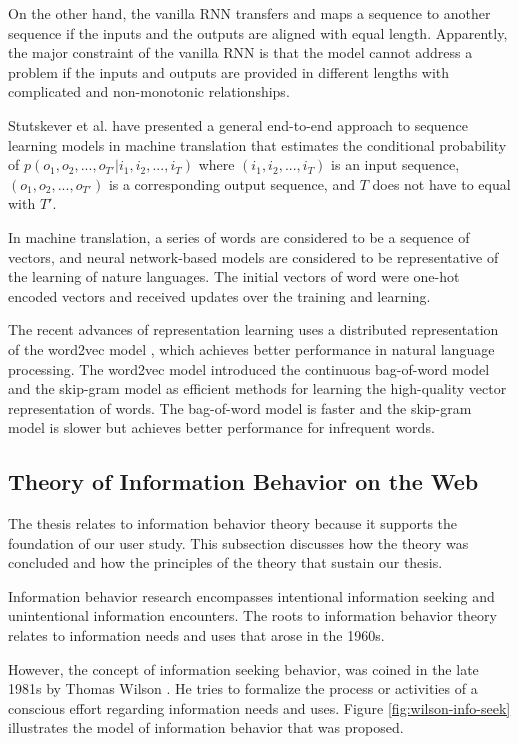 On the other hand, the vanilla RNN transfers and maps a sequence to another sequence if 
the inputs and the outputs are aligned with equal length. 
Apparently, the major constraint of the vanilla RNN
is that the model cannot address a problem if the inputs and outputs are provided 
in different lengths with complicated and non-monotonic relationships.

Stutskever et al. \cite{DBLP:journals/corr/SutskeverVL14} have presented a general end-to-end approach
to sequence learning models in machine translation that estimates the conditional probability of 
$p(o_1, o_2, ..., o_{T'} | i_1, i_2, ..., i_T)$ where $(i_1, i_2, ..., i_T)$ is an input sequence,
$(o_1, o_2, ..., o_{T'})$ is a corresponding output sequence, and $T$ does not have to equal with $T'$.

In machine translation, a series of words are considered to be a sequence of
vectors, and neural network-based models are considered to be representative of 
the learning of nature languages.
The initial vectors of word were one-hot encoded vectors and received updates over the training and learning.

The recent advances of representation learning uses a distributed representation 
of the word2vec model \cite{DBLP:journals/corr/abs-1301-3781}, which achieves better 
performance in natural language processing. The word2vec model introduced the 
continuous bag-of-word model and the skip-gram model as efficient methods for learning the high-quality
vector representation of words. The bag-of-word model is faster and the skip-gram model is slower 
but achieves better performance for infrequent words.

\subsection{Theory of Information Behavior on the Web}
\label{sec:info-seek}

The thesis relates to information behavior theory because it supports the foundation of our
user study. This subsection discusses how the theory was concluded and 
how the principles of the theory that sustain our thesis.

Information behavior research encompasses intentional information seeking and 
unintentional information encounters. The roots to information behavior 
theory relates to information needs and uses \cite{doi:10.1002/aris.2009.1440430114} 
that arose in the 1960s.

However, the concept of information seeking behavior, was coined in the late 1981s 
by Thomas Wilson \cite{wilson1981user}. He tries to formalize the process or 
activities of a conscious effort regarding information needs 
and uses. Figure \ref{fig:wilson-info-seek} illustrates the model of information behavior 
that was proposed.

